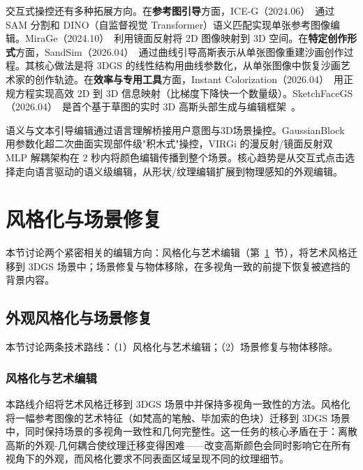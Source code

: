 交互式操控还有多种拓展方向。在\textbf{参考图引导}方面，ICE-G（2024.06）~\cite{2406_08488}通过 SAM 分割和 DINO（自监督视觉 Transformer）语义匹配实现单张参考图像编辑。MiraGe（2024.10）~\cite{2410_01521}利用镜面反射将 2D 图像映射到 3D 空间。在\textbf{特定创作形式}方面，SandSim（2026.04）~\cite{2604_27572}通过曲线引导高斯表示从单张图像重建沙画创作过程。其核心做法是将 3DGS 的线性结构用曲线参数化，从单张图像中恢复沙画艺术家的创作轨迹。在\textbf{效率与专用工具}方面，Instant Colorization（2026.04）~\cite{2604_17155}用正规方程实现高效 2D 到 3D 信息映射（比梯度下降快一个数量级）。SketchFaceGS（2026.04）~\cite{2604_19202}是首个基于草图的实时 3D 高斯头部生成与编辑框架~\cite{2510_09537,2511_22228,2601_03319,2603_28152,2603_15368}。

\begin{takeaway}
语义与文本引导编辑通过语言理解桥接用户意图与3D场景操控。GaussianBlock 用参数化超二次曲面实现部件级"积木式"操控，VIRGi 的漫反射/镜面反射双 MLP 解耦架构在 2 秒内将颜色编辑传播到整个场景。核心趋势是从交互式点击选择走向语言驱动的语义级编辑，从形状/纹理编辑扩展到物理感知的外观编辑。
\end{takeaway}



\section{风格化与场景修复}
\label{sec:09_2}

本节讨论两个紧密相关的编辑方向：风格化与艺术编辑（第~\ref{sec:09_2}~节），将艺术风格迁移到 3DGS 场景中；场景修复与物体移除，在多视角一致的前提下恢复被遮挡的背景内容。

\subsection{外观风格化与场景修复}
\label{ss:09_2}

本节讨论两条技术路线：（1）风格化与艺术编辑；（2）场景修复与物体移除。

\subsubsection{风格化与艺术编辑}

本路线介绍将艺术风格迁移到 3DGS 场景中并保持多视角一致性的方法。风格化将一幅参考图像的艺术特征（如梵高的笔触、毕加索的色块）迁移到 3DGS 场景中，同时保持场景的多视角一致性和几何完整性。这一任务的核心矛盾在于：离散高斯的外观-几何耦合使纹理迁移变得困难——改变高斯颜色会同时影响它在所有视角下的外观，而风格化要求不同表面区域呈现不同的纹理细节。

